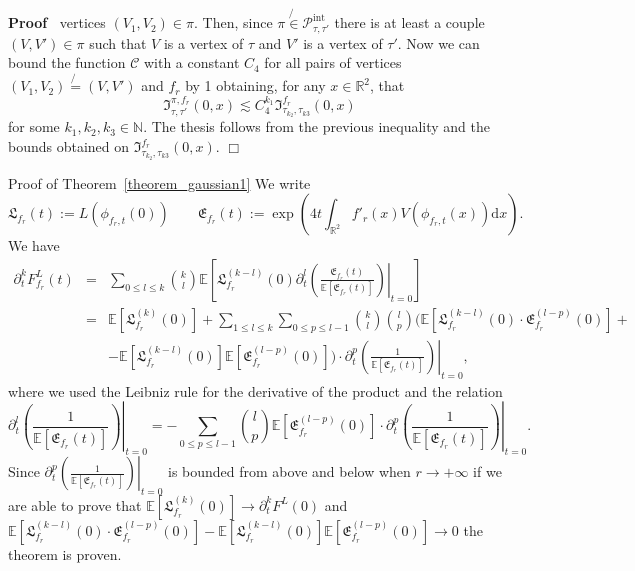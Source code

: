 \documentclass[a4paper,10pt]{article}
\newcommand{\assign}{:=}
\newcommand{\mathd}{\mathrm{d}}
\newcommand{\nobracket}{}
\newcommand{\tmop}[1]{\ensuremath{\operatorname{#1}}}
\newenvironment{proof}{\noindent\textbf{Proof\ }}{\hspace*{\fill}$\Box$\medskip}
\newenvironment{proof*}[1]{\noindent\textbf{#1\ }}{\hspace*{\fill}$\Box$\medskip}
\begin{document}
\begin{proof}
  vertices $(V_1, V_2) \in \pi$. Then, since $\pi \not{\in}
  \mathcal{P}^{\tmop{int}}_{\tau, \tau'}$ there is at least a couple $(V, V')
  \in \pi$ such that $V$ is a vertex of $\tau$ and $V'$ is a vertex of
  $\tau'$. Now we can bound the function $\mathcal{C}$ with a constant $C_4$
  for all pairs of vertices $(V_1, V_2) \not{=} (V, V')$ and $f_r$ by 1
  obtaining, for any $x \in \mathbb{R}^2$, that
  \[ \mathfrak{I}^{\pi, f_r}_{\tau, \tau'} (0, x) \lesssim C_4^{k_1}
     \mathfrak{I}^{f_r}_{\tau_{k_2}, \tau_{k 3}} (0, x) \]
  for some $k_1, k_2, k_3 \in \mathbb{N}$. The thesis follows from the
  previous inequality and the bounds obtained on
  $\mathfrak{I}^{f_r}_{\tau_{k_2}, \tau_{k 3}} (0, x) .$
\end{proof}

\begin{proof*}{Proof of Theorem~\ref{theorem_gaussian1}}
  We write
  \[ \mathfrak{L}_{f_r} (t) \assign L (\phi_{f_r, t} (0)) \qquad
     \mathfrak{E}_{f_r} (t) \assign \exp \left( 4 t \int_{\mathbb{R}^2} f'_r
     (x) V (\phi_{f_r, t} (x)) \mathd x \right) . \]
  We have
  \begin{eqnarray*}
    \partial^k_t F^L_{f_r} (t) & = & \sum_{0 \leqslant l \leqslant k}
    \binom{k}{l} \mathbb{E} \left[ \mathfrak{L}_{f_r}^{(k - l)} (0) \left.
    \partial^l_t \left( \frac{\mathfrak{E}_{f_r} (t)}{\mathbb{E}
    [\mathfrak{E}_{f_r} (t)]} \right) \right|_{t = 0} \right]\\
    & = & \mathbb{E} [\mathfrak{L}_{f_r}^{(k)} (0) \mathfrak{}] + \sum_{1
    \leqslant l \leqslant k} \sum_{0 \leqslant p \leqslant l - 1} \binom{k}{l}
    \binom{l}{p} (\mathbb{E}[\mathfrak{L}^{(k - l)}_{f_r} (0) \cdot
    \mathfrak{E}^{(l - p)}_{f_r} (0)] + \nobracket\\
    &  & \nobracket -\mathbb{E}[\mathfrak{L}^{(k - l)}_{f_r}
    (0)]\mathbb{E}[\mathfrak{E}^{(l - p)}_{f_r} (0)]) \cdot \left.
    \partial^p_t \left( \frac{1}{\mathbb{E} [\mathfrak{E}_{f_r} (t)]} \right)
    \right|_{t = 0},
  \end{eqnarray*}
  where we used the Leibniz rule for the derivative of the product and the
  relation
  \[ \left. \partial^l_t \left( \frac{1}{\mathbb{E} [\mathfrak{E}_{f_r} (t)]}
     \right) \right|_{t = 0} = - \sum_{0 \leqslant p \leqslant l - 1}
     \binom{l}{p} \mathbb{E} [\mathfrak{E}^{(l - p)}_{f_r} (0)] \cdot \left.
     \partial^p_t \left( \frac{1}{\mathbb{E} [\mathfrak{E}_{f_r} (t)]} \right)
     \right|_{t = 0} . \]
  Since $\left. \partial^p_t \left( \frac{1}{\mathbb{E} [\mathfrak{E}_{f_r}
  (t)]} \right) \right|_{t = 0}$ is bounded from above and below when $r
  \rightarrow + \infty$ if we are able to prove that $\mathbb{E}
  [\mathfrak{L}_{f_r}^{(k)} (0) \mathfrak{}] \rightarrow \partial^k_t F^L (0)$
  and $\mathbb{E} [\mathfrak{L}^{(k - l)}_{f_r} (0) \cdot \mathfrak{E}^{(l -
  p)}_{f_r} (0)] -\mathbb{E} [\mathfrak{L}^{(k - l)}_{f_r} (0)] \mathbb{E}
  [\mathfrak{E}^{(l - p)}_{f_r} (0)] \rightarrow 0$ the theorem is proven.
  

\end{proof*}
\end{document}
